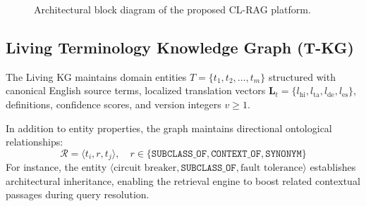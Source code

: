 \documentclass[conference]{IEEEtran}
\begin{document}
\begin{figure}[htbp]
\centering
{}
\caption{Architectural block diagram of the proposed CL-RAG platform.}
\label{fig:architecture}
\end{figure}

\subsection{Living Terminology Knowledge Graph (T-KG)}
The Living KG maintains domain entities $T = \{t_1, t_2, \dots, t_m\}$ structured with canonical English source terms, localized translation vectors $\mathbf{L}_t = \{l_{\text{hi}}, l_{\text{ta}}, l_{\text{de}}, l_{\text{es}}\}$, definitions, confidence scores, and version integers $v \ge 1$.

In addition to entity properties, the graph maintains directional ontological relationships:
\begin{equation}
\mathcal{R} = \langle t_i, r, t_j \rangle, \quad r \in \{\texttt{SUBCLASS\_OF}, \texttt{CONTEXT\_OF}, \texttt{SYNONYM}\}
\end{equation}
For instance, the entity $\langle \text{circuit breaker}, \texttt{SUBCLASS\_OF}, \text{fault tolerance} \rangle$ establishes architectural inheritance, enabling the retrieval engine to boost related contextual passages during query resolution.
\end{document}
